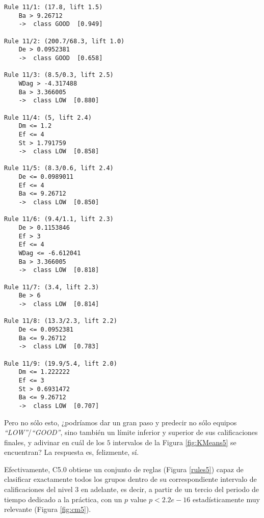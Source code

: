 \begin{tcolorbox}[title=Reglas de clasificación para identificar grupos de tipo \emph{``LOW''}.]
  \makeatletter
  \makeatother
\begin{multicols}{2}
    \begin{verbatim}
Rule 11/1: (17.8, lift 1.5)
	Ba > 9.26712
	->  class GOOD  [0.949]

Rule 11/2: (200.7/68.3, lift 1.0)
	De > 0.0952381
	->  class GOOD  [0.658]

Rule 11/3: (8.5/0.3, lift 2.5)
	WDag > -4.317488
	Ba > 3.366005
	->  class LOW  [0.880]

Rule 11/4: (5, lift 2.4)
	Dm <= 1.2
	Ef <= 4
	St > 1.791759
	->  class LOW  [0.858]

Rule 11/5: (8.3/0.6, lift 2.4)
	De <= 0.0989011
	Ef <= 4
	Ba <= 9.26712
	->  class LOW  [0.850]

Rule 11/6: (9.4/1.1, lift 2.3)
	De > 0.1153846
	Ef > 3
	Ef <= 4
	WDag <= -6.612041
	Ba > 3.366005
	->  class LOW  [0.818]

Rule 11/7: (3.4, lift 2.3)
	Be > 6
	->  class LOW  [0.814]

Rule 11/8: (13.3/2.3, lift 2.2)
	De <= 0.0952381
	Ba <= 9.26712
	->  class LOW  [0.783]

Rule 11/9: (19.9/5.4, lift 2.0)
	Dm <= 1.222222
	Ef <= 3
	St > 0.6931472
	Ba <= 9.26712
	->  class LOW  [0.707]
    \end{verbatim}
  \end{multicols}
\label{rules2}
\end{tcolorbox}

Pero no sólo esto, ¿podríamos dar un gran paso y predecir no sólo equipos \emph{``LOW''}/\emph{``GOOD''}, sino también un límite inferior y superior de sus calificaciones finales, y adivinar en cuál de los $5$ intervalos de la Figura \ref{fig:KMeans5} se encuentran? La respuesta es, felizmente, sí.

Efectivamente, C5.0 obtiene un conjunto de reglas (Figura \ref{rules5}) capaz de clasificar exactamente todos los grupos dentro de su correspondiente intervalo de calificaciones del nivel $3$ en adelante, es decir, a partir de un tercio del periodo de tiempo dedicado a la práctica, con un $p$ value $p < 2.2e-16$ estadísticamente muy relevante (Figura \ref{fig:cm5}).

